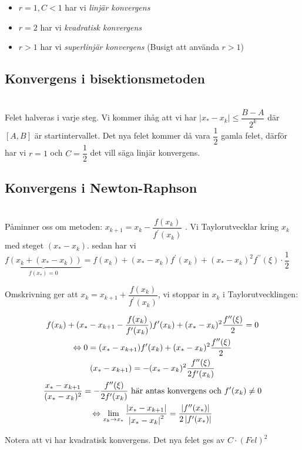 \begin{itemize}
  \item $r=1, C<1$ har vi \textit{linjär konvergens}
  \item $r=2$ har vi \textit{kvadratisk konvergens}
  \item $r>1$ har vi \textit{superlinjär konvergens} (Busigt att använda $r>1$)
\end{itemize}
\par\bigskip

\subsection{Konvergens i bisektionsmetoden}\hfill\\

\noindent Felet halveras i varje steg. Vi kommer ihåg att vi har $\left|x_*-x_k\right|\leq \dfrac{B-A}{2^k}$ där $[A,B]$ är startintervallet. Det nya felet kommer då vara $\dfrac{1}{2}$ gamla felet, därför har vi $r=1$ och $C=\dfrac{1}{2}$ det vill säga linjär konvergens.
\par\bigskip

\subsection{Konvergens i Newton-Raphson}\hfill\\

\noindent Påminner oss om metoden: $x_{k+1} = x_k -\dfrac{f(x_k)}{f^{\prime}(x_k)}$ . Vi Taylorutvecklar kring $x_k$ med steget $(x_*-x_k)$. sedan har vi $\underbrace{f(x_k+(x_*-x_k))}_{\text{$f(x_*)=0$}} = f(x_k)+(x_*-x_k)f^{\prime}(x_k)+(x_*-x_k)^2f^{\prime\prime}(\xi)\cdot\dfrac{1}{2}$
\par\bigskip
\noindent Omskrivning ger att $x_k = x_{k+1}+\dfrac{f(x_k)}{f^{\prime}(x_k)}$, vi stoppar in $x_k$ i Taylorutvecklingen:


\begin{equation*}
  \begin{gathered}
    f(x_k)+(x_*-x_{k+1}-\dfrac{f(x_k)}{f^{\prime}(x_k)})f^{\prime}(x_k)+(x_*-x_k)^2\dfrac{f^{\prime\prime}(\xi)}{2} = 0\\
    \Leftrightarrow 0 = (x_*-x_{k+1})f^{\prime}(x_k)+(x_*-x_k)^2\dfrac{f^{\prime\prime}(\xi)}{2}\\
    (x_*-x_{k+1})=-(x_*-x_k)^2\dfrac{f^{\prime\prime}(\xi)}{2f^{\prime}(x_k)}\\
    \dfrac{x_*-x_{k+1}}{(x_*-x_k)^2}=-\dfrac{f^{\prime\prime}(\xi)}{2f^{\prime}(x_k)} \text{ här antas konvergens och $f^{\prime}(x_k)\neq 0$}\\
    \Leftrightarrow\lim_{x_k\to x_*} \dfrac{\left|x_*-x_{k+1}\right|}{\left|x_*-x_k\right|^2} = \dfrac{\left|f^{\prime\prime}(x_*)\right|}{2\left|f^{\prime}(x_*)\right|}
  \end{gathered}
\end{equation*}
\par\bigskip
\noindent Notera att vi har kvadratisk konvergens. Det nya felet ges av $C\cdot(Fel)^2$
\par\bigskip
